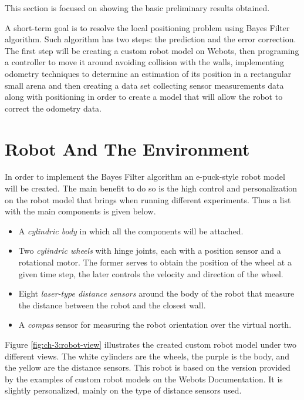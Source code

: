 This section is focused on showing the basic preliminary results obtained. 

A short-term goal is to resolve the local positioning problem using Bayes Filter algorithm. Such algorithm has two steps: the prediction and the error correction. The first step will be creating a custom robot model on Webots, then programing a controller to move it around avoiding collision with the walls, implementing odometry techniques to determine an estimation of its position in a rectangular small arena and then creating a data set collecting sensor measurements data along with positioning in order to create a model that will allow the robot to correct the odometry data.

\section{Robot And The Environment}

In order to implement the Bayes Filter algorithm an e-puck-style robot model will be created. The main benefit to do so is the high control and personalization on the robot model that brings when running different experiments. Thus a list with the main components is given below.

\begin{itemize}
\item A \textit{cylindric body} in which all the components will be attached. 
\item Two \textit{cylindric wheels} with hinge joints, each with a position sensor and a rotational motor. The former serves to obtain the position of the wheel at a given time step, the later controls the velocity and direction of the wheel.
\item Eight \textit{laser-type distance sensors} around the body of the robot that measure the distance between the robot and the closest wall.
\item A \textit{compas} sensor for measuring the robot orientation over the virtual north.
\end{itemize}

Figure \ref{fig:ch-3:robot-view} illustrates the created custom robot model under two different views. The white cylinders are the wheels, the purple is the body, and the yellow are the distance sensors. This robot is based on the version provided by the examples of custom robot models on the Webots Documentation. It is slightly personalized, mainly on the type of distance sensors used.

